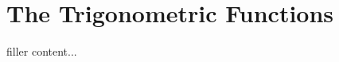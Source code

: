 \documentclass[../../templates/section]{subfiles}
\begin{document}
\section{The Trigonometric Functions}\label{sec:the-trigonometric-functions}

filler content...
\end{document}
